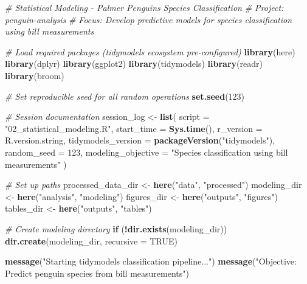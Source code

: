 \documentclass[
]{article}
\newenvironment{Shaded}{\begin{snugshade}}{\end{snugshade}}
\newcommand{\AttributeTok}[1]{\textcolor[rgb]{0.13,0.29,0.53}{#1}}
\newcommand{\CommentTok}[1]{\textcolor[rgb]{0.56,0.35,0.01}{\textit{#1}}}
\newcommand{\ConstantTok}[1]{\textcolor[rgb]{0.56,0.35,0.01}{#1}}
\newcommand{\ControlFlowTok}[1]{\textcolor[rgb]{0.13,0.29,0.53}{\textbf{#1}}}
\newcommand{\DecValTok}[1]{\textcolor[rgb]{0.00,0.00,0.81}{#1}}
\newcommand{\FunctionTok}[1]{\textcolor[rgb]{0.13,0.29,0.53}{\textbf{#1}}}
\newcommand{\NormalTok}[1]{#1}
\newcommand{\OtherTok}[1]{\textcolor[rgb]{0.56,0.35,0.01}{#1}}
\newcommand{\SpecialCharTok}[1]{\textcolor[rgb]{0.81,0.36,0.00}{\textbf{#1}}}
\newcommand{\StringTok}[1]{\textcolor[rgb]{0.31,0.60,0.02}{#1}}
\begin{document}
\begin{Shaded}
\begin{Highlighting}[]
\CommentTok{\# Statistical Modeling {-} Palmer Penguins Species Classification}
\CommentTok{\# Project: penguin{-}analysis}
\CommentTok{\# Focus: Develop predictive models for species classification using bill measurements}

\CommentTok{\# Load required packages (tidymodels ecosystem pre{-}configured)}
\FunctionTok{library}\NormalTok{(here)}
\FunctionTok{library}\NormalTok{(dplyr)}
\FunctionTok{library}\NormalTok{(ggplot2)}
\FunctionTok{library}\NormalTok{(tidymodels)}
\FunctionTok{library}\NormalTok{(readr)}
\FunctionTok{library}\NormalTok{(broom)}

\CommentTok{\# Set reproducible seed for all random operations}
\FunctionTok{set.seed}\NormalTok{(}\DecValTok{123}\NormalTok{)}

\CommentTok{\# Session documentation}
\NormalTok{session\_log }\OtherTok{\textless{}{-}} \FunctionTok{list}\NormalTok{(}
  \AttributeTok{script =} \StringTok{"02\_statistical\_modeling.R"}\NormalTok{,}
  \AttributeTok{start\_time =} \FunctionTok{Sys.time}\NormalTok{(),}
  \AttributeTok{r\_version =}\NormalTok{ R.version.string,}
  \AttributeTok{tidymodels\_version =} \FunctionTok{packageVersion}\NormalTok{(}\StringTok{"tidymodels"}\NormalTok{),}
  \AttributeTok{random\_seed =} \DecValTok{123}\NormalTok{,}
  \AttributeTok{modeling\_objective =} \StringTok{"Species classification using bill measurements"}
\NormalTok{)}

\CommentTok{\# Set up paths}
\NormalTok{processed\_data\_dir }\OtherTok{\textless{}{-}} \FunctionTok{here}\NormalTok{(}\StringTok{"data"}\NormalTok{, }\StringTok{"processed"}\NormalTok{)}
\NormalTok{modeling\_dir }\OtherTok{\textless{}{-}} \FunctionTok{here}\NormalTok{(}\StringTok{"analysis"}\NormalTok{, }\StringTok{"modeling"}\NormalTok{)}
\NormalTok{figures\_dir }\OtherTok{\textless{}{-}} \FunctionTok{here}\NormalTok{(}\StringTok{"outputs"}\NormalTok{, }\StringTok{"figures"}\NormalTok{)}
\NormalTok{tables\_dir }\OtherTok{\textless{}{-}} \FunctionTok{here}\NormalTok{(}\StringTok{"outputs"}\NormalTok{, }\StringTok{"tables"}\NormalTok{)}

\CommentTok{\# Create modeling directory}
\ControlFlowTok{if}\NormalTok{ (}\SpecialCharTok{!}\FunctionTok{dir.exists}\NormalTok{(modeling\_dir)) }\FunctionTok{dir.create}\NormalTok{(modeling\_dir, }\AttributeTok{recursive =} \ConstantTok{TRUE}\NormalTok{)}

\FunctionTok{message}\NormalTok{(}\StringTok{"Starting tidymodels classification pipeline..."}\NormalTok{)}
\FunctionTok{message}\NormalTok{(}\StringTok{"Objective: Predict penguin species from bill measurements"}\NormalTok{)}


\end{Highlighting}
\end{Shaded}
\end{document}
